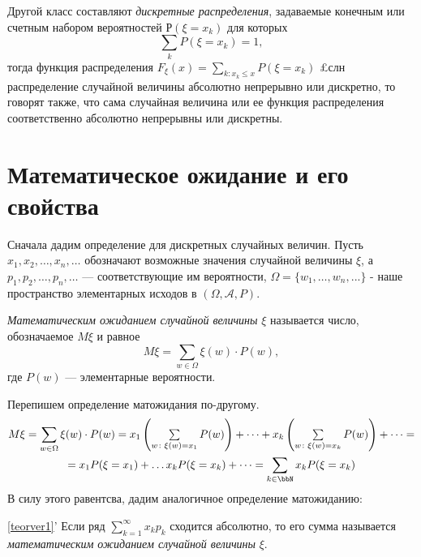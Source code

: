 Другой класс составляют \textit{дискретные распределения}, задаваемые конечным или счетным набором вероятностей $Р(\xi=x_k)$ для которых
$$
\sum\limits_k P(\xi=x_k)=1,
$$
тогда функция распределения $F_\xi(x)=\sum\limits_{k: x_k \le x} P(\xi=x_k)$
£слн распределение случайной величины абсолютно непрерывно или дискретно, то говорят также, что сама случайная величина или ее функция распределения соответственно абсолютно непрерывны или дискретны.

\section{Математическое ожидание и его свойства}

Сначала дадим определение для дискретных случайных величин. Пусть $x_1,x_2,\dots,x_n,\dots$ обозначают возможные значения случайной величины $\xi$, а $p_1,p_2,\dots,p_n,\dots$ --- соответствующие им вероятности, $\Omega = \{w_1,\dots, w_n,...\}$ - наше пространство элементарных исходов в $(\Omega,\mathcal A, P)$.
\begin{defn}\label{teorver1}
\textit{Математическим ожиданием случайной величины} $\xi$ называется число, обозначаемое $M\xi$ и равное
\begin{equation}
M\xi = \sum_{w \in \Omega} \xi(w)\cdot P(w),
\end{equation}
где $P(w)$ --- элементарные вероятности.
\end{defn}
Перепишем определение матожидания по-другому.
\begin{multline*}
M\xi=\sum_{w \in \Omega} \xi(w)\cdot P(w)=x_1\left(\textstyle\sum\limits_{w\colon \xi(w)=x_1} P(w)\right)+\dots+x_k\left(\textstyle\sum\limits_{w\colon \xi(w)=x_k} P(w)\right)+\dots=\\=x_1P(\xi=x_1)+\dots x_kP(\xi=x_k)+\dots=\sum_{k\in \bbN} x_kP(\xi=x_k)
\end{multline*}
В силу этого равентсва, дадим аналогичное определение матожиданию:
\begin{defnn}{\ref{teorver1}'}\label{teorver1s}
Если ряд $\sum\limits_{k=1}^{\infty}x_k p_k$ сходится абсолютно, то его сумма называется \textit{математическим ожиданием случайной величины} $\xi$.
\end{defnn}


